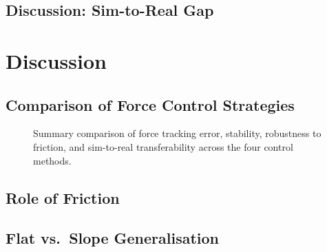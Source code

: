 \documentclass[
	german,%
	accentcolor=9c,%
	ruledheaders=section,%
	class=report,%
	thesis={type=bachelor},%
	fontsize=11pt,%
	parskip=half-,%
	custommargins=true,%
	marginpar=false,%
]{tudapub}
\begin{document}
\section{Discussion: Sim-to-Real Gap}



\chapter{Discussion}

\section{Comparison of Force Control Strategies}


\begin{figure}[htbp]
    \centering
    \caption{Summary comparison of force tracking error, stability, robustness
             to friction, and sim-to-real transferability across the four
             control methods.}
    \label{fig:method_comparison}
\end{figure}


\section{Role of Friction}



\section{Flat vs.\ Slope Generalisation}
\end{document}
